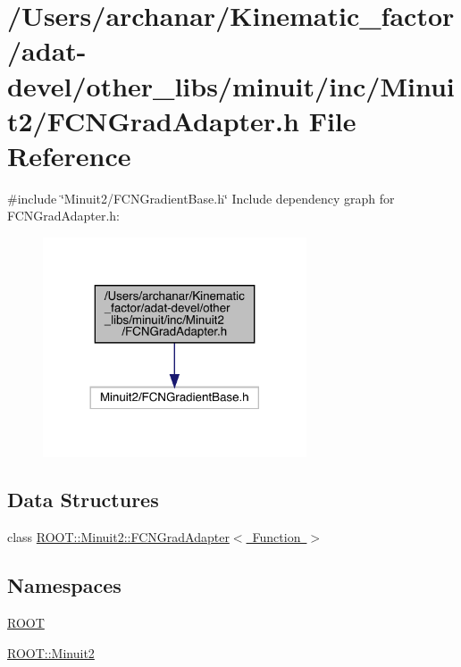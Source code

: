 \hypertarget{adat-devel_2other__libs_2minuit_2inc_2Minuit2_2FCNGradAdapter_8h}{}\section{/\+Users/archanar/\+Kinematic\+\_\+factor/adat-\/devel/other\+\_\+libs/minuit/inc/\+Minuit2/\+F\+C\+N\+Grad\+Adapter.h File Reference}
\label{adat-devel_2other__libs_2minuit_2inc_2Minuit2_2FCNGradAdapter_8h}
{\ttfamily \#include \char`\"{}Minuit2/\+F\+C\+N\+Gradient\+Base.\+h\char`\"{}}\newline
Include dependency graph for F\+C\+N\+Grad\+Adapter.\+h\+:
\nopagebreak
\begin{figure}[H]
\begin{center}
\leavevmode
\includegraphics[width=221pt]{d3/d11/adat-devel_2other__libs_2minuit_2inc_2Minuit2_2FCNGradAdapter_8h__incl}
\end{center}
\end{figure}
\subsection*{Data Structures}
\begin{DoxyCompactItemize}
\item 
class \mbox{\hyperlink{classROOT_1_1Minuit2_1_1FCNGradAdapter}{R\+O\+O\+T\+::\+Minuit2\+::\+F\+C\+N\+Grad\+Adapter$<$ Function $>$}}
\end{DoxyCompactItemize}
\subsection*{Namespaces}
\begin{DoxyCompactItemize}
\item 
 \mbox{\hyperlink{namespaceROOT}{R\+O\+OT}}
\item 
 \mbox{\hyperlink{namespaceROOT_1_1Minuit2}{R\+O\+O\+T\+::\+Minuit2}}
\end{DoxyCompactItemize}
